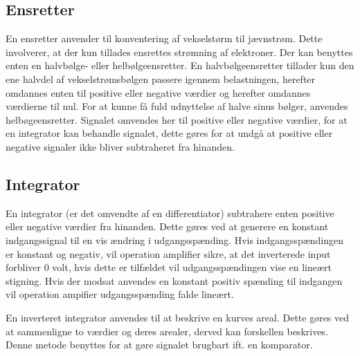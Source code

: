 \subsection{Ensretter}
En ensretter anvender til konventering af vekselstørm til jævnstrøm. Dette involverer, at der kun tillades ensrettes strømning af elektroner. Der kan benyttes enten en halvbølge- eller helbølgeensretter. En halvbølgeensretter tillader kun den ene halvdel af vekselstrømsbølgen passere igennem belastningen, herefter omdannes enten til positive eller negative værdier og herefter omdannes værdierne til nul.
For at kunne få fuld udnyttelse af halve sinus bølger, anvendes helbøgeensretter. Signalet omvendes her til positive eller negative værdier, for at en integrator kan behandle signalet, dette gøres for at undgå at positive eller negative signaler ikke bliver subtraheret fra hinanden. \cite{http://www.allaboutcircuits.com/textbook/semiconductors/chpt-3/rectifier-circuits/}

\subsection{Integrator}
En integrator (er det omvendte af en differentiator) subtrahere enten positive eller negative værdier fra hinanden. Dette gøres ved at generere en konstant indgangssignal til en vis ændring i udgangsspænding. Hvis indgangsspændingen er konstant og negativ, vil operation amplifier sikre, at det inverterede input forbliver 0 volt, hvis dette er tilfældet vil udgangsspændingen vise en lineært stigning. Hvis der modsat anvendes en konstant positiv spænding til indgangen vil operation ampifier udgangsspænding falde lineært. 

En inverteret integrator anvendes til at beskrive en kurves areal. Dette gøres ved at sammenligne to værdier og deres arealer, derved kan forskellen beskrives. Denne metode benyttes for at gøre signalet brugbart ift. en komparator.

